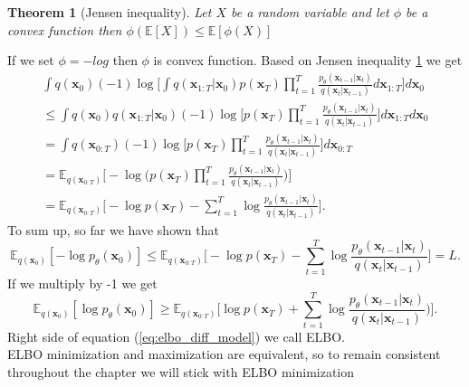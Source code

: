 \documentclass[10pt]{article}
\newtheorem{Twierdzenie}{Theorem}[section]
\begin{document}
\begin{Twierdzenie}[Jensen inequality] 
\label{th:jensen}
Let $X$ be a random variable and let $\phi$ be a convex function then  $\phi( \mathbb{E}[X] ) \leq \mathbb{E}[\phi(X)] $
\end{Twierdzenie}
If we set $\phi = -log$ then  $\phi$ is convex function. Based on Jensen inequality \ref{th:jensen}
we get
\begin{gather}
\int q( \textbf{x}_{0})(-1)\log
    \Bigg[
        \int q(\textbf{x}_{1:T}|\textbf{x}_{0}) p( \textbf{x}_{T}  )  \prod_{t=1}^{T}
         \frac{ p_{\theta}( \textbf{x}_{t-1}|  \textbf{x}_{t }    ) }
        { q( \textbf{x}_{t}|  \textbf{x}_{t -1 }  )} d\textbf{x}_{1:T}
    \Bigg] d \textbf{x}_{0}\\
\leq \int q( \textbf{x}_{0})q(\textbf{x}_{1:T}|\textbf{x}_{0}) (-1)\log 
\Bigg[
    p( \textbf{x}_{T}  )  \prod_{t=1}^{T}
    \frac{ p_{\theta}( \textbf{x}_{t-1}|  \textbf{x}_{t }  ) }
    { q( \textbf{x}_{t}|  \textbf{x}_{t -1 }  )}
\Bigg] d\textbf{x}_{1:T} d \textbf{x}_{0} \\
= \int q(\textbf{x}_{0:T}) (-1)\log 
\Bigg[
    p( \textbf{x}_{T}  )  \prod_{t=1}^{T}
    \frac{ p_{\theta}( \textbf{x}_{t-1}|  \textbf{x}_{t }  )   }
    { q( \textbf{x}_{t}|  \textbf{x}_{t -1 }  )}
\Bigg] d\textbf{x}_{0:T} \\ 
=    \mathbb{E}_{q(\textbf{x}_{0:T})} \Bigg[ -\log \Big( p( \textbf{x}_{T}  )  \prod_{t=1}^{T}
    \frac{ p_{\theta}( \textbf{x}_{t-1}|  \textbf{x}_{t }  )   }
    { q( \textbf{x}_{t}|  \textbf{x}_{t -1 }  )} \Big) \Bigg] \\
= \label{eq:dif_elbo_form}
\mathbb{E}_{q(\textbf{x}_{0:T})} \Bigg[ -\log p( \textbf{x}_{T}) -  \sum_{t=1}^{T}\log
    \frac{ p_{\theta}( \textbf{x}_{t-1}|  \textbf{x}_{t }  )   }
    { q( \textbf{x}_{t}|  \textbf{x}_{t -1 }  )} \Bigg].
\end{gather} 
To sum up, so far we have shown that
\begin{equation}
   \mathbb{E}_{q(\textbf{x}_{0})} [-\log  p_{\theta}( \textbf{x}_{0}) ] \leq
    \mathbb{E}_{q(\textbf{x}_{0:T})} \Bigg[ -\log p( \textbf{x}_{T}) -  \sum_{t=1}^{T}\log
    \frac{ p_{\theta}( \textbf{x}_{t-1}|  \textbf{x}_{t }  )   }
    { q( \textbf{x}_{t}|  \textbf{x}_{t -1 }  )}  \Bigg]
    = L.
\end{equation}
If we multiply by -1 we get
\begin{equation} \label{eq:elbo_diff_model}
   \mathbb{E}_{q(\textbf{x}_{0})} [\log  p_{\theta}( \textbf{x}_{0}) ] \geq
    \mathbb{E}_{q(\textbf{x}_{0:T})} \Bigg[ \log p( \textbf{x}_{T}) +  \sum_{t=1}^{T}\log
    \frac{ p_{\theta}( \textbf{x}_{t-1}|  \textbf{x}_{t }  )   }
    { q( \textbf{x}_{t}|  \textbf{x}_{t -1 }  )} ) \Bigg].
\end{equation}
Right side of equation (\ref{eq:elbo_diff_model}) we call ELBO.\\
ELBO minimization and maximization are equivalent, so to remain consistent throughout the chapter we will stick with ELBO minimization
\end{document}
